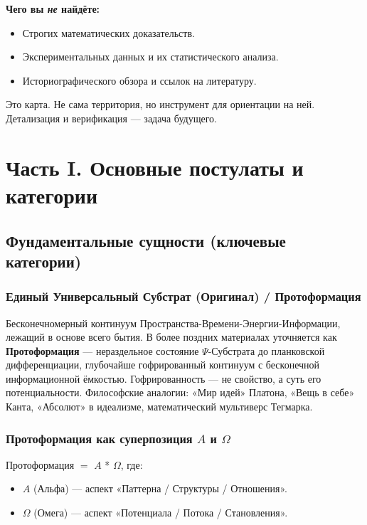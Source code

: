\documentclass[a4paper,12pt]{article}
\begin{document}
\textbf{Чего вы \emph{не} найдёте:}
\begin{itemize}
	\item Строгих математических доказательств.
	\item Экспериментальных данных и их статистического анализа.
	\item Историографического обзора и ссылок на литературу.
\end{itemize}

Это карта. Не сама территория, но инструмент для ориентации на ней. Детализация и верификация — задача будущего.

\newpage
\section{Часть I. Основные постулаты и категории}

\subsection{Фундаментальные сущности (ключевые категории)}

\subsubsection{Единый Универсальный Субстрат (Оригинал) / Протоформация}

Бесконечномерный континуум Пространства-Времени-Энергии-Информации, лежащий в основе всего бытия. В более поздних материалах уточняется как \textbf{Протоформация} — нераздельное состояние $\Psi$-Субстрата до планковской дифференциации, глубочайше гофрированный континуум с бесконечной информационной ёмкостью. Гофрированность — не свойство, а суть его потенциальности. Философские аналогии: «Мир идей» Платона, «Вещь в себе» Канта, «Абсолют» в идеализме, математический мультиверс Тегмарка.

\subsubsection{Протоформация как суперпозиция $A$ и $\Omega$}

Протоформация $=$ $A$ * $\Omega$, где:
\begin{itemize}
	\item $A$ (Альфа) — аспект «Паттерна / Структуры / Отношения».
	\item $\Omega$ (Омега) — аспект «Потенциала / Потока / Становления».
\end{itemize}
\end{document}
